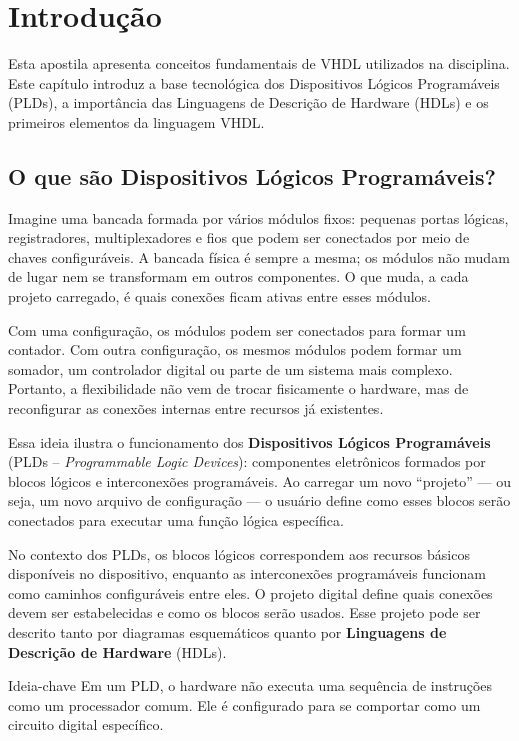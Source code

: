 \chapter{Introdução}

Esta apostila apresenta conceitos fundamentais de VHDL utilizados na disciplina. Este capítulo introduz a base tecnológica dos Dispositivos Lógicos Programáveis (PLDs), a importância das Linguagens de Descrição de Hardware (HDLs) e os primeiros elementos da linguagem VHDL.

\section{O que são Dispositivos Lógicos Programáveis?}

Imagine uma bancada formada por vários módulos fixos: pequenas portas lógicas, registradores, multiplexadores e fios que podem ser conectados por meio de chaves configuráveis. A bancada física é sempre a mesma; os módulos não mudam de lugar nem se transformam em outros componentes. O que muda, a cada projeto carregado, é quais conexões ficam ativas entre esses módulos.

Com uma configuração, os módulos podem ser conectados para formar um contador. Com outra configuração, os mesmos módulos podem formar um somador, um controlador digital ou parte de um sistema mais complexo. Portanto, a flexibilidade não vem de trocar fisicamente o hardware, mas de reconfigurar as conexões internas entre recursos já existentes.

Essa ideia ilustra o funcionamento dos \textbf{Dispositivos Lógicos Programáveis} (PLDs – \textit{Programmable Logic Devices}): componentes eletrônicos formados por blocos lógicos e interconexões programáveis. Ao carregar um novo ``projeto'' — ou seja, um novo arquivo de configuração — o usuário define como esses blocos serão conectados para executar uma função lógica específica.

No contexto dos PLDs, os blocos lógicos correspondem aos recursos básicos disponíveis no dispositivo, enquanto as interconexões programáveis funcionam como caminhos configuráveis entre eles. O projeto digital define quais conexões devem ser estabelecidas e como os blocos serão usados. Esse projeto pode ser descrito tanto por diagramas esquemáticos quanto por \textbf{Linguagens de Descrição de Hardware} (HDLs).

\begin{observacao}{Ideia-chave}
Em um PLD, o hardware não executa uma sequência de instruções como um processador comum. Ele é configurado para se comportar como um circuito digital específico.
\end{observacao}

